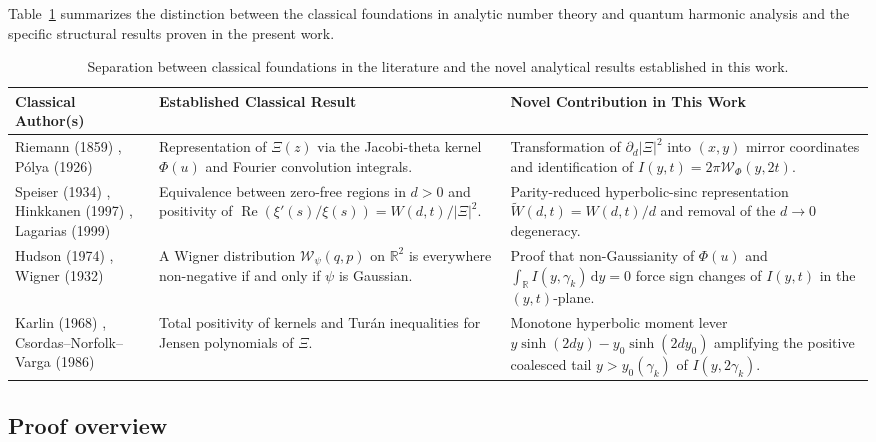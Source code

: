 \documentclass[11pt,a4paper,reqno]{amsart}
\theoremstyle{definition}
\theoremstyle{remark}
\numberwithin{equation}{section}
\newcommand{\dd}{\mathrm{d}}
\newcommand{\Rea}{\operatorname{Re}}
\newcommand{\Wig}{\mathcal{W}}
\newcommand{\Wtil}{\widetilde{W}}
\begin{document}
Table~\ref{tab:literature} summarizes the distinction between the classical foundations in analytic number theory and quantum harmonic analysis and the specific structural results proven in the present work.

\begin{table}[htbp]
\centering
\caption{Separation between classical foundations in the literature and the novel analytical results established in this work.}\label{tab:literature}
\footnotesize
\begin{tabular}{p{} p{} p{}}
\toprule
\textbf{Classical Author(s)} & \textbf{Established Classical Result} & \textbf{Novel Contribution in This Work} \\
\midrule
Riemann (1859) \cite{Riemann1859}, P\'olya (1926) \cite{Polya1926} & Representation of $\Xi(z)$ via the Jacobi-theta kernel $\Phi(u)$ and Fourier convolution integrals. & Transformation of $\partial_d|\Xi|^2$ into $(x,y)$ mirror coordinates and identification of $I(y,t) = 2\pi\Wig_\Phi(y,2t)$. \\
\addlinespace[3pt]
Speiser (1934) \cite{Speiser1934}, Hinkkanen (1997) \cite{Hinkkanen1997}, Lagarias (1999) \cite{Lagarias1999} & Equivalence between zero-free regions in $d>0$ and positivity of $\Rea(\xi'(s)/\xi(s)) = W(d,t)/|\Xi|^2$. & Parity-reduced hyperbolic-sinc representation $\Wtil(d,t) = W(d,t)/d$ and removal of the $d\to 0$ degeneracy. \\
\addlinespace[3pt]
Hudson (1974) \cite{Hudson1974}, Wigner (1932) \cite{Wigner1932} & A Wigner distribution $\Wig_\psi(q,p)$ on $\mathbb{R}^2$ is everywhere non-negative if and only if $\psi$ is Gaussian. & Proof that non-Gaussianity of $\Phi(u)$ and $\int_{\mathbb{R}} I(y,\gamma_k)\,\dd y = 0$ force sign changes of $I(y,t)$ in the $(y,t)$-plane. \\
\addlinespace[3pt]
Karlin (1968) \cite{Karlin1968}, Csordas--Norfolk--Varga (1986) \cite{Csordas1986} & Total positivity of kernels and Tur\'an inequalities for Jensen polynomials of $\Xi$. & Monotone hyperbolic moment lever $y\sinh(2d y) - y_0\sinh(2d y_0)$ amplifying the positive coalesced tail $y > y_0(\gamma_k)$ of $I(y,2\gamma_k)$. \\
\bottomrule
\end{tabular}
\end{table}

\subsection{Proof overview}\label{subsec:proof_overview}
\end{document}
